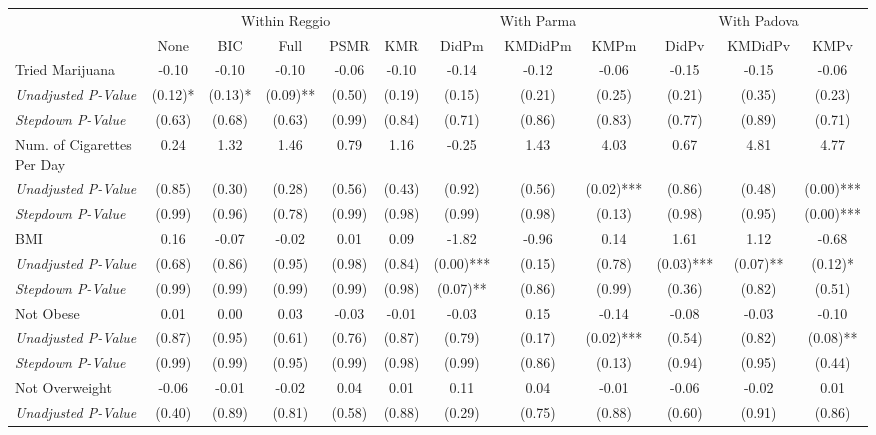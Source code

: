 \begin{tabular}{l c c c c c c c c c c c}
\toprule
& \multicolumn{5}{c}{Within Reggio} & \multicolumn{3}{c}{With Parma} & \multicolumn{3}{c}{With Padova} \\\cmidrule(lr){2-6} \cmidrule(lr){7-9} \cmidrule(lr){10-12}
 & None & BIC & Full & PSMR & KMR & DidPm & KMDidPm & KMPm & DidPv & KMDidPv & KMPv \\
\midrule
Tried Marijuana & -0.10 & -0.10 & -0.10 & -0.06 & -0.10 & -0.14 & -0.12 & -0.06 & -0.15 & -0.15 & -0.06 \\
\quad \textit{Unadjusted P-Value} & (0.12)* & (0.13)* & (0.09)** & (0.50) & (0.19) & (0.15) & (0.21) & (0.25) & (0.21) & (0.35) & (0.23) \\
\quad \textit{Stepdown P-Value} & (0.63) & (0.68) & (0.63) & (0.99) & (0.84) & (0.71) & (0.86) & (0.83) & (0.77) & (0.89) & (0.71) \\
Num. of Cigarettes Per Day & 0.24 & 1.32 & 1.46 & 0.79 & 1.16 & -0.25 & 1.43 & 4.03 & 0.67 & 4.81 & 4.77 \\
\quad \textit{Unadjusted P-Value} & (0.85) & (0.30) & (0.28) & (0.56) & (0.43) & (0.92) & (0.56) & (0.02)*** & (0.86) & (0.48) & (0.00)*** \\
\quad \textit{Stepdown P-Value} & (0.99) & (0.96) & (0.78) & (0.99) & (0.98) & (0.99) & (0.98) & (0.13) & (0.98) & (0.95) & (0.00)*** \\
BMI & 0.16 & -0.07 & -0.02 & 0.01 & 0.09 & -1.82 & -0.96 & 0.14 & 1.61 & 1.12 & -0.68 \\
\quad \textit{Unadjusted P-Value} & (0.68) & (0.86) & (0.95) & (0.98) & (0.84) & (0.00)*** & (0.15) & (0.78) & (0.03)*** & (0.07)** & (0.12)* \\
\quad \textit{Stepdown P-Value} & (0.99) & (0.99) & (0.99) & (0.99) & (0.98) & (0.07)** & (0.86) & (0.99) & (0.36) & (0.82) & (0.51) \\
Not Obese & 0.01 & 0.00 & 0.03 & -0.03 & -0.01 & -0.03 & 0.15 & -0.14 & -0.08 & -0.03 & -0.10 \\
\quad \textit{Unadjusted P-Value} & (0.87) & (0.95) & (0.61) & (0.76) & (0.87) & (0.79) & (0.17) & (0.02)*** & (0.54) & (0.82) & (0.08)** \\
\quad \textit{Stepdown P-Value} & (0.99) & (0.99) & (0.95) & (0.99) & (0.98) & (0.99) & (0.86) & (0.13) & (0.94) & (0.95) & (0.44) \\
Not Overweight & -0.06 & -0.01 & -0.02 & 0.04 & 0.01 & 0.11 & 0.04 & -0.01 & -0.06 & -0.02 & 0.01 \\
\quad \textit{Unadjusted P-Value} & (0.40) & (0.89) & (0.81) & (0.58) & (0.88) & (0.29) & (0.75) & (0.88) & (0.60) & (0.91) & (0.86) \\

\end{tabular}
